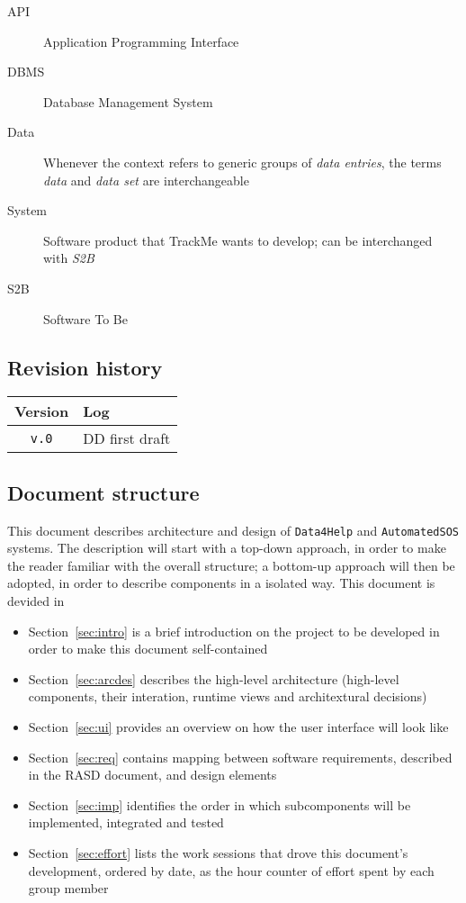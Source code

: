 \documentclass[../DD0.tex]{subfiles}
\newcommand{\addRevision}[2]{\texttt{v.#1} & #2 \\ \hline}
\begin{document}
    \begin{description}
      \item[API] Application Programming Interface
      \item[DBMS] Database Management System
      \item[Data] Whenever the context refers to generic groups of \textit{data entries}, the terms \textit{data} and \textit{data set} are interchangeable
      \item[System] Software product that TrackMe wants to develop; can be interchanged with \textit{S2B}
      \item[S2B] Software To Be
    \end{description}

  \subsection{Revision history}
  \label{sec:revhistory}

    \begin{table}[!h]
      \begin{tabular}{|c|l|}
        \hline
        \textbf{Version}  & \textbf{Log} \\ \hline
        \addRevision{0}{DD first draft}
      \end{tabular}
    \end{table}

  \subsection{Document structure}
  \label{sec:docstructure}

  This document describes architecture and design of \texttt{Data4Help} and \texttt{AutomatedSOS} systems. The description will start with a top-down approach, in order to make the reader familiar with the overall structure; a bottom-up approach will then be adopted, in order to describe components in a isolated way. This document is devided in
  \begin{itemize}
    \item Section~\ref{sec:intro} is a brief introduction on the project to be developed in order to make this document self-contained
    \item Section~\ref{sec:arcdes} describes the high-level architecture (high-level components, their interation, runtime views and architextural decisions)
    \item Section~\ref{sec:ui} provides an overview on how the user interface will look like
    \item Section~\ref{sec:req} contains mapping between software requirements, described in the RASD document, and design elements
    \item Section~\ref{sec:imp} identifies the order in which subcomponents will be implemented, integrated and tested
    \item Section~\ref{sec:effort} lists the work sessions that drove this document's development, ordered by date, as the hour counter of effort spent by each group member
  \end{itemize}
\end{document}
